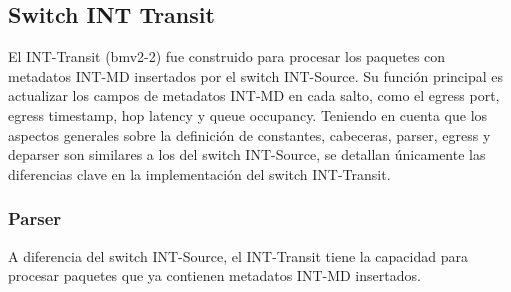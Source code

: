\subsection{Switch INT Transit}
El INT-Transit (bmv2-2) fue construido para procesar los paquetes con metadatos INT-MD insertados por el switch INT-Source. Su función principal es actualizar los campos de metadatos INT-MD en cada salto, como el egress port, egress timestamp, hop latency y queue occupancy. 
Teniendo en cuenta que los aspectos generales sobre la definición de constantes, cabeceras, parser, egress y deparser son similares a los del switch INT-Source, se detallan únicamente las diferencias clave en la implementación del switch INT-Transit.

\subsubsection{Parser}
A diferencia del switch INT-Source, el INT-Transit tiene la capacidad para procesar paquetes que ya contienen metadatos INT-MD insertados.

